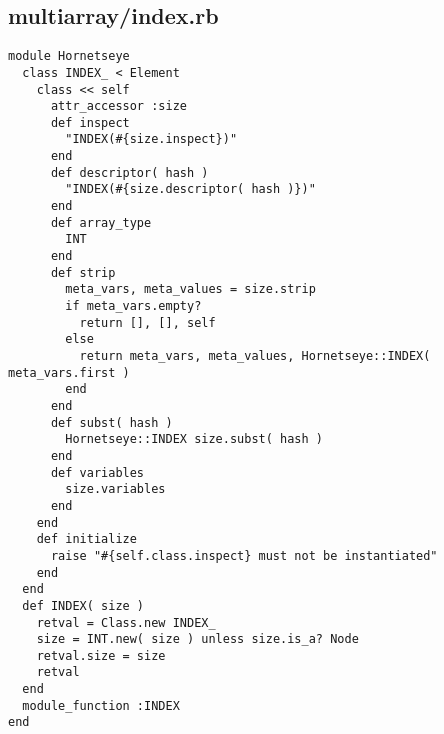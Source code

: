 \subsection{multiarray/index.rb}\label{cha:multiarray-index-rb}
\begin{lstlisting}
module Hornetseye
  class INDEX_ < Element
    class << self
      attr_accessor :size
      def inspect
        "INDEX(#{size.inspect})"
      end
      def descriptor( hash )
        "INDEX(#{size.descriptor( hash )})"
      end
      def array_type
        INT
      end
      def strip
        meta_vars, meta_values = size.strip
        if meta_vars.empty?
          return [], [], self
        else
          return meta_vars, meta_values, Hornetseye::INDEX( meta_vars.first )
        end
      end
      def subst( hash )
        Hornetseye::INDEX size.subst( hash )
      end
      def variables
        size.variables
      end
    end
    def initialize
      raise "#{self.class.inspect} must not be instantiated"
    end
  end
  def INDEX( size )
    retval = Class.new INDEX_
    size = INT.new( size ) unless size.is_a? Node
    retval.size = size
    retval
  end
  module_function :INDEX
end
\end{lstlisting}
